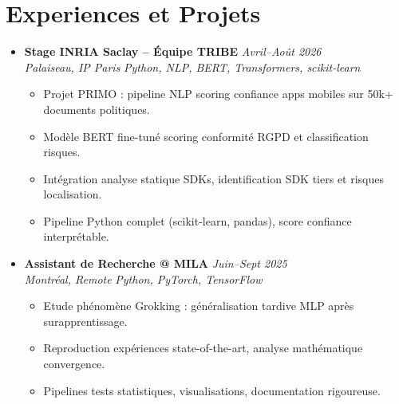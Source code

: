 \documentclass[a4paper,11pt]{article}
\begin{document}
\section{Experiences et Projets}
\begin{itemize}[leftmargin=0.5cm, nosep]

    \item \textbf{Stage INRIA Saclay -- \'Equipe TRIBE} \hfill \textit{Avril--Ao\^ut 2026} \\
    \textit{Palaiseau, IP Paris} \hfill \textit{Python, NLP, BERT, Transformers, scikit-learn}
    \vspace{-2pt}
    \begin{itemize}[leftmargin=0.4cm, nosep, label=\tiny$\bullet$]
        \item \small{Projet PRIMO : pipeline NLP scoring confiance apps mobiles sur 50k+ documents politiques.}
        \item \small{Mod\`ele BERT fine-tun\'e scoring conformit\'e RGPD et classification risques.}
        \item \small{Int\'egration analyse statique SDKs, identification SDK tiers et risques localisation.}
        \item \small{Pipeline Python complet (scikit-learn, pandas), score confiance interpr\'etable.}
    \end{itemize}
    \vspace{3pt}

    \item \textbf{Assistant de Recherche @ MILA} \hfill \textit{Juin--Sept 2025} \\
    \textit{Montr\'eal, Remote} \hfill \textit{Python, PyTorch, TensorFlow}
    \vspace{-2pt}
    \begin{itemize}[leftmargin=0.4cm, nosep, label=\tiny$\bullet$]
        \item \small{Etude ph\'enom\`ene Grokking : g\'en\'eralisation tardive MLP apr\`es surapprentissage.}
        \item \small{Reproduction exp\'eriences state-of-the-art, analyse math\'ematique convergence.}
        \item \small{Pipelines tests statistiques, visualisations, documentation rigoureuse.}
    \end{itemize}
    \vspace{3pt}


\end{itemize}
\end{document}
